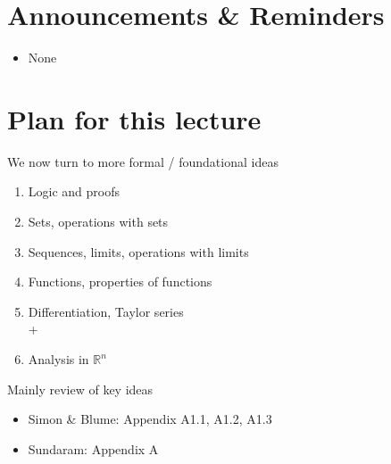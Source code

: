 \documentclass[letterpaper,10pt,english]{jupyterBook}
\begin{document}
\section{Announcements \& Reminders}
\label{\detokenize{03.set_theory:announcements-reminders}}\begin{itemize}
\item {} 
\sphinxAtStartPar
None

\end{itemize}


\section{Plan for this lecture}
\label{\detokenize{03.set_theory:plan-for-this-lecture}}
\sphinxAtStartPar
We now turn to more formal / foundational ideas
\begin{enumerate}
%
\item {} 
\sphinxAtStartPar
Logic and proofs

\item {} 
\sphinxAtStartPar
Sets, operations with sets

\item {} 
\sphinxAtStartPar
Sequences, limits, operations with limits

\item {} 
\sphinxAtStartPar
Functions, properties of functions

\item {} 
\sphinxAtStartPar
Differentiation, Taylor series\\
+

\item {} 
\sphinxAtStartPar
Analysis in \(\mathbb{R}^n\)

\end{enumerate}

\sphinxAtStartPar
Mainly review of key ideas

\sphinxAtStartPar
{}
\begin{itemize}
\item {} 
\sphinxAtStartPar
Simon \& Blume: Appendix A1.1, A1.2, A1.3

\item {} 
\sphinxAtStartPar
Sundaram: Appendix A

\end{itemize}
\end{document}

